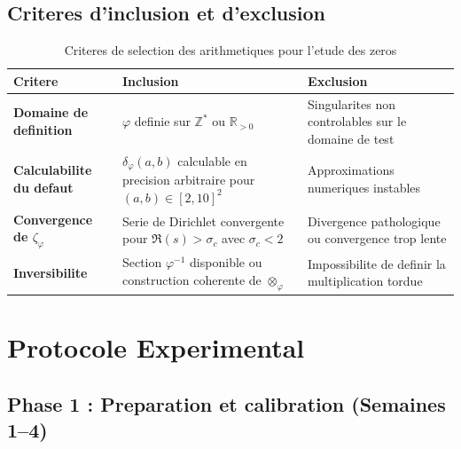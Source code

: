 \documentclass[11pt,a4paper]{article}
\begin{document}
	\subsection{Criteres d'inclusion et d'exclusion}
	\begin{table}[ht]
		\centering
		\caption{Criteres de selection des arithmetiques pour l'etude des zeros}
		\label{tab:criteria}
		\begin{tabular}{p{4cm}p{5cm}p{5cm}}
			\toprule
			\textbf{Critere} & \textbf{Inclusion} & \textbf{Exclusion} \\
			\midrule
			\textbf{Domaine de definition} & $\varphi$ definie sur $\mathbb{Z}^*$ ou $\mathbb{R}_{>0}$ & Singularites non controlables sur le domaine de test \\
			\textbf{Calculabilite du defaut} & $\delta_\varphi(a,b)$ calculable en precision arbitraire pour $(a,b)\in[2,10]^2$ & Approximations numeriques instables \\
			\textbf{Convergence de $\zeta_\varphi$} & Serie de Dirichlet convergente pour $\Re(s) > \sigma_c$ avec $\sigma_c < 2$ & Divergence pathologique ou convergence trop lente \\
			\textbf{Inversibilite} & Section $\varphi^{-1}$ disponible ou construction coherente de $\otimes_\varphi$ & Impossibilite de definir la multiplication tordue \\
			\bottomrule
		\end{tabular}
	\end{table}
	
	\section{Protocole Experimental}
	\label{sec:protocole}
	
	\subsection{Phase 1 : Preparation et calibration (Semaines 1--4)}
	
\end{document}
